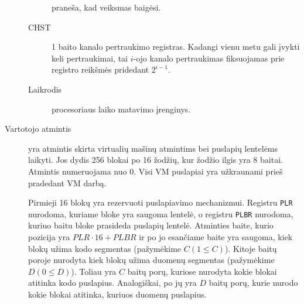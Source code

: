 \begin{description}
\begin{description}
        praneša, kad veiksmas baigėsi. 
      \item[CHST] 1 baito kanalo pertraukimo registras. Kadangi vienu metu 
        gali įvykti keli pertraukimai, tai $i$-ojo kanalo pertraukimas
        fiksuojamas prie registro reikšmės pridedant $2^{i-1}$.
      \item[Laikrodis] procesoriaus laiko matavimo įrenginys.
    \end{description}
  \item[Vartotojo atmintis] yra atmintis skirta virtualių mašinų atmintims 
    bei puslapių lentelėms laikyti. Jos dydis 256 blokai po 16 žodžių, kur
    žodžio ilgis yra 8 baitai. Atmintis numeruojama nuo 0. Visi VM 
    puslapiai yra užkraunami prieš pradedant VM darbą.

    Pirmieji 16 blokų yra rezervuoti puslapiavimo mechanizmui. Registru
    \verb|PLR| nurodoma, kuriame bloke yra saugoma lentelė, o registru
    \verb|PLBR| nurodoma, kuriuo baitu bloke prasideda puslapių lentelė.
    Atminties baite, kurio pozicija yra $PLR \cdot 16 + PLBR$ ir po jo 
    esančiame baite yra saugoma, kiek blokų užima kodo segmentas 
    (pažymėkime $C (1 \leq C)$). Kitoje baitų poroje nurodyta kiek blokų 
    užima duomenų segmentas (pažymėkime $D (0 \leq D)$). Toliau yra 
    $C$ baitų porų, kuriose nurodyta kokie blokai atitinka kodo puslapius.
    Analogiškai, po jų yra $D$ baitų porų, kurie nurodo kokie blokai 
    atitinka, kuriuos duomenų puslapius.


\end{description}
